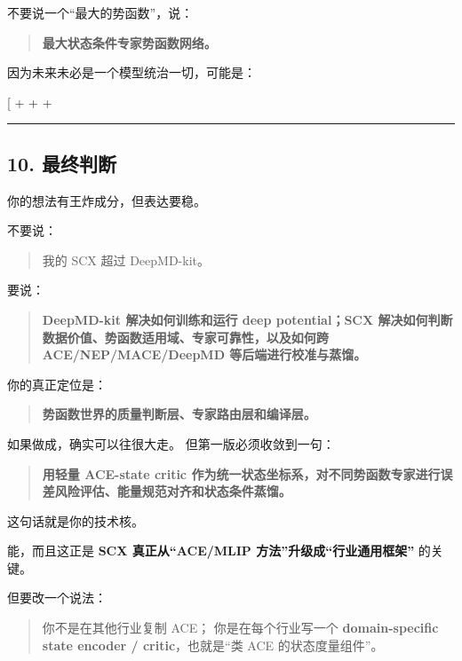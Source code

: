\documentclass[
  12pt,
]{ctexart}
\begin{document}
不要说一个``最大的势函数''，说：

\begin{quote}
\textbf{最大状态条件专家势函数网络。}
\end{quote}

因为未来未必是一个模型统治一切，可能是：

{[}  + 
+  + \text{DFT active correction}{]}

\begin{center}\rule{0.5\linewidth}{0.5pt}\end{center}

\subsection{10. 最终判断}\label{ux6700ux7ec8ux5224ux65ad-14}

你的想法有王炸成分，但表达要稳。

不要说：

\begin{quote}
我的 SCX 超过 DeepMD-kit。
\end{quote}

要说：

\begin{quote}
\textbf{DeepMD-kit 解决如何训练和运行 deep potential；SCX
解决如何判断数据价值、势函数适用域、专家可靠性，以及如何跨
ACE/NEP/MACE/DeepMD 等后端进行校准与蒸馏。}
\end{quote}

你的真正定位是：

\begin{quote}
\textbf{势函数世界的质量判断层、专家路由层和编译层。}
\end{quote}

如果做成，确实可以往很大走。 但第一版必须收敛到一句：

\begin{quote}
\textbf{用轻量 ACE-state critic
作为统一状态坐标系，对不同势函数专家进行误差风险评估、能量规范对齐和状态条件蒸馏。}
\end{quote}

这句话就是你的技术核。

能，而且这正是 \textbf{SCX 真正从``ACE/MLIP
方法''升级成``行业通用框架''} 的关键。

但要改一个说法：

\begin{quote}
你不是在其他行业复制 ACE； 你是在每个行业写一个 \textbf{domain-specific
state encoder / critic}，也就是``类 ACE 的状态度量组件''。
\end{quote}
\end{document}
